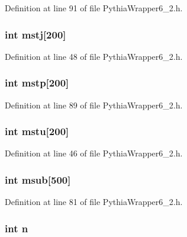 Definition at line 91 of file Pythia\-Wrapper6\_\-2.h.
\subsubsection{\setlength{\rightskip}{0pt plus 5cm}int {\bf mstj}[200]}\label{PythiaWrapper6__2_8h_217d232beaf8b22999723b2394722469}




Definition at line 48 of file Pythia\-Wrapper6\_\-2.h.
\subsubsection{\setlength{\rightskip}{0pt plus 5cm}int {\bf mstp}[200]}\label{PythiaWrapper6__2_8h_2377ed5e6e420a6ab179a75941583701}




Definition at line 89 of file Pythia\-Wrapper6\_\-2.h.
\subsubsection{\setlength{\rightskip}{0pt plus 5cm}int {\bf mstu}[200]}\label{PythiaWrapper6__2_8h_54fee093d39e3b7961c31466f751ea2b}




Definition at line 46 of file Pythia\-Wrapper6\_\-2.h.
\subsubsection{\setlength{\rightskip}{0pt plus 5cm}int {\bf msub}[500]}\label{PythiaWrapper6__2_8h_56d0f8258ff29bbe062b22cc48da1b3d}




Definition at line 81 of file Pythia\-Wrapper6\_\-2.h.
\subsubsection{\setlength{\rightskip}{0pt plus 5cm}int {\bf n}}\label{PythiaWrapper6__2_8h_76f11d9a0a47b94f72c2d0e77fb32240}




